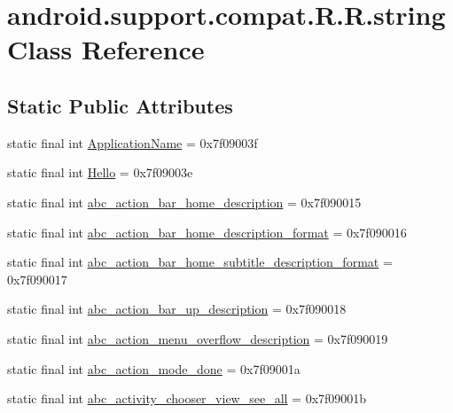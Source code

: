 \hypertarget{classandroid_1_1support_1_1compat_1_1_r_1_1string}{
\section{android.support.compat.R.R.string Class Reference}
\label{classandroid_1_1support_1_1compat_1_1_r_1_1string}
}
\subsection*{Static Public Attributes}
\begin{CompactItemize}
\item 
static final int \hyperlink{classandroid_1_1support_1_1compat_1_1_r_1_1string_0cc1d1fd76d8c50a087cfc5979c325ee}{ApplicationName} = 0x7f09003f
\item 
static final int \hyperlink{classandroid_1_1support_1_1compat_1_1_r_1_1string_81f358d0d18bc6f994bc930e7be4ebba}{Hello} = 0x7f09003e
\item 
static final int \hyperlink{classandroid_1_1support_1_1compat_1_1_r_1_1string_f5b578bd12acfd3ed568232a63bca9ca}{abc\_\-action\_\-bar\_\-home\_\-description} = 0x7f090015
\item 
static final int \hyperlink{classandroid_1_1support_1_1compat_1_1_r_1_1string_4a3a914a7edc1895d0c564eb26b5889c}{abc\_\-action\_\-bar\_\-home\_\-description\_\-format} = 0x7f090016
\item 
static final int \hyperlink{classandroid_1_1support_1_1compat_1_1_r_1_1string_a7182b02793663e9b80a1b28fc316a2b}{abc\_\-action\_\-bar\_\-home\_\-subtitle\_\-description\_\-format} = 0x7f090017
\item 
static final int \hyperlink{classandroid_1_1support_1_1compat_1_1_r_1_1string_625764af743f6c0c319ad911d0d46567}{abc\_\-action\_\-bar\_\-up\_\-description} = 0x7f090018
\item 
static final int \hyperlink{classandroid_1_1support_1_1compat_1_1_r_1_1string_59adbc22c17143bbeba29906f066acb8}{abc\_\-action\_\-menu\_\-overflow\_\-description} = 0x7f090019
\item 
static final int \hyperlink{classandroid_1_1support_1_1compat_1_1_r_1_1string_b23c7c79fdb0b518aa5ac8c94a9d9dad}{abc\_\-action\_\-mode\_\-done} = 0x7f09001a
\item 
static final int \hyperlink{classandroid_1_1support_1_1compat_1_1_r_1_1string_a705ff75377aa97b7fc00e9ebca0982c}{abc\_\-activity\_\-chooser\_\-view\_\-see\_\-all} = 0x7f09001b

\end{CompactItemize}
